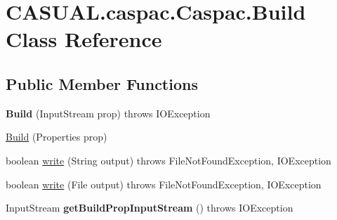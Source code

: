 \hypertarget{classCASUAL_1_1caspac_1_1Caspac_1_1Build}{\section{C\-A\-S\-U\-A\-L.\-caspac.\-Caspac.\-Build Class Reference}
\label{classCASUAL_1_1caspac_1_1Caspac_1_1Build}
}
\subsection*{Public Member Functions}
\begin{DoxyCompactItemize}
\item 
\hypertarget{classCASUAL_1_1caspac_1_1Caspac_1_1Build_a10be80f79917bde176b2adfc86cac412}{{\bfseries Build} (Input\-Stream prop)  throws I\-O\-Exception }\label{classCASUAL_1_1caspac_1_1Caspac_1_1Build_a10be80f79917bde176b2adfc86cac412}

\item 
\hyperlink{classCASUAL_1_1caspac_1_1Caspac_1_1Build_a08e2bee2ba8eeb91e8f6ce29b6adca65}{Build} (Properties prop)
\item 
boolean \hyperlink{classCASUAL_1_1caspac_1_1Caspac_1_1Build_a20fe31e79339dd62322455b84562ca34}{write} (String output)  throws File\-Not\-Found\-Exception, I\-O\-Exception 
\item 
boolean \hyperlink{classCASUAL_1_1caspac_1_1Caspac_1_1Build_a6716fc08f8781e8887c5d30b8bebe10a}{write} (File output)  throws File\-Not\-Found\-Exception, I\-O\-Exception 
\item 
\hypertarget{classCASUAL_1_1caspac_1_1Caspac_1_1Build_a19c3b39c50785f03993b9eda141060c8}{Input\-Stream {\bfseries get\-Build\-Prop\-Input\-Stream} ()  throws I\-O\-Exception }\label{classCASUAL_1_1caspac_1_1Caspac_1_1Build_a19c3b39c50785f03993b9eda141060c8}

\end{DoxyCompactItemize}
